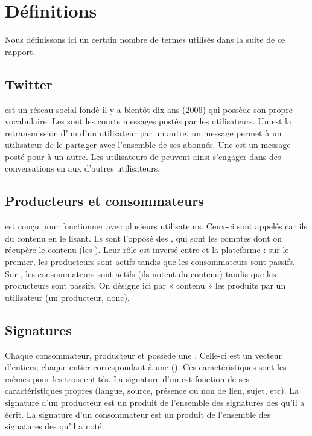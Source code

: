 \section{Définitions}

Nous définissons ici un certain nombre de termes utilisés dans la suite de ce
rapport.

\subsection{Twitter}

\twt{} est un réseau social fondé il y a bientôt dix ans (2006) qui possède son
propre vocabulaire. Les \I{\tweets{}} sont les courts messages postés par les
utilisateurs. Un \I{\rt{}} est la retransmission d’un \tweet{} d’un utilisateur
par un autre.  un message permet à un utilisateur de le partager
avec l’ensemble de ses abonnés. Une  est un message posté pour
 à un autre. Les utilisateurs de \twt{} peuvent ainsi s’engager
dans des conversations en  aux \tweets{} d’autres utilisateurs.

\subsection{Producteurs et consommateurs}

\tb{} est conçu pour fonctionner avec plusieurs utilisateurs. Ceux-ci sont
appelés  car ils  du contenu en le lisant. Ils
sont l’opposé des , qui sont les comptes \twt{} dont on récupère
le contenu (les \tweets{}). Leur rôle est inversé entre \twt{} et la plateforme
\tb{} : sur le premier, les producteurs sont actifs tandis que les
consommateurs sont passifs. Sur \tb{}, les consommateurs sont actifs (ils
notent du contenu) tandis que les producteurs sont passifs. On désigne ici par
« contenu » les \I{\tweets{}} produits par un utilisateur (un producteur,
donc).

\subsection{Signatures}

Chaque consommateur, producteur et \tweet{} possède une . Celle-ci
est un vecteur d’entiers, chaque entier correspondant à une 
(). Ces caractéristiques sont les mêmes pour les trois entités. La
signature d’un \tweet{} est fonction de ses caractéristiques propres (langue,
source, présence ou non de lien, sujet, etc). La signature d’un producteur est
un produit de l’ensemble des signatures des \tweets{} qu’il a écrit. La
signature d’un consommateur est un produit de l’ensemble des signatures des
\tweets{} qu’il a noté.
